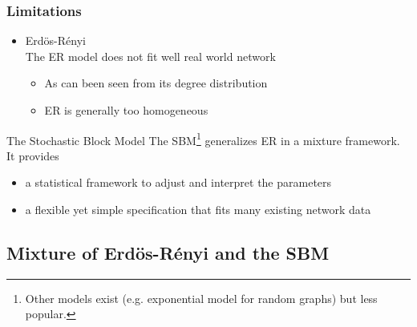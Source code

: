 \documentclass{beamer}\usepackage[]{graphicx}\usepackage[]{color}
\begin{document}
\begin{frame}
  \frametitle{Limitations}

    \begin{itemize}
    \item \alert{Erdös-Rényi}\\
      The ER model does not fit well real world network
      \begin{itemize}
        \item As can been seen from its degree distribution
        \item ER is generally too homogeneous
      \end{itemize}
    \end{itemize}

  \vfill

  \begin{block}{The Stochastic Block Model}
    The SBM\footnote{Other models exist (e.g. exponential model for random graphs) but less popular.} generalizes ER in a mixture framework. It provides
    \begin{itemize}
      \item a statistical framework to adjust and interpret the parameters
      \item a flexible yet simple specification that fits many existing network data
    \end{itemize}
  \end{block}

\end{frame}


\subsection{Mixture of Erdös-Rényi and the SBM}
\end{document}
